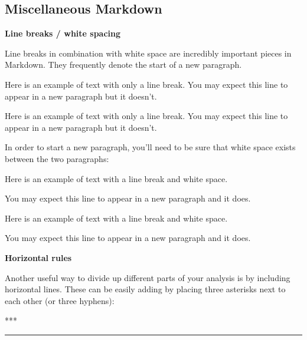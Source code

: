 \documentclass[]{tufte-book}
\newenvironment{Shaded}{\begin{snugshade}}{\end{snugshade}}
\newcommand{\NormalTok}[1]{{#1}}
\theoremstyle{definition}
\theoremstyle{definition}
\theoremstyle{remark}
\begin{document}
\subsection{Miscellaneous Markdown}\label{miscellaneous-markdown}

\textbf{Line breaks / white spacing}

Line breaks in combination with white space are incredibly important
pieces in Markdown. They frequently denote the start of a new paragraph.

\begin{Shaded}
\begin{Highlighting}[]
\NormalTok{Here is an example of text with only a line break.}
\NormalTok{You may expect this line to appear in a new paragraph but it doesn't.}
\end{Highlighting}
\end{Shaded}

Here is an example of text with only a line break. You may expect this
line to appear in a new paragraph but it doesn't.

In order to start a new paragraph, you'll need to be sure that white
space exists between the two paragraphs:

\begin{Shaded}
\begin{Highlighting}[]
\NormalTok{Here is an example of text with a line break and white space.}

\NormalTok{You may expect this line to appear in a new paragraph and it does.}
\end{Highlighting}
\end{Shaded}

Here is an example of text with a line break and white space.

You may expect this line to appear in a new paragraph and it does.

\textbf{Horizontal rules}

Another useful way to divide up different parts of your analysis is by
including horizontal lines. These can be easily adding by placing three
asterisks next to each other (or three hyphens):

\begin{Shaded}
\begin{Highlighting}[]
\NormalTok{***}
\end{Highlighting}
\end{Shaded}

\begin{center}\rule{0.5\linewidth}{\linethickness}\end{center}
\end{document}

